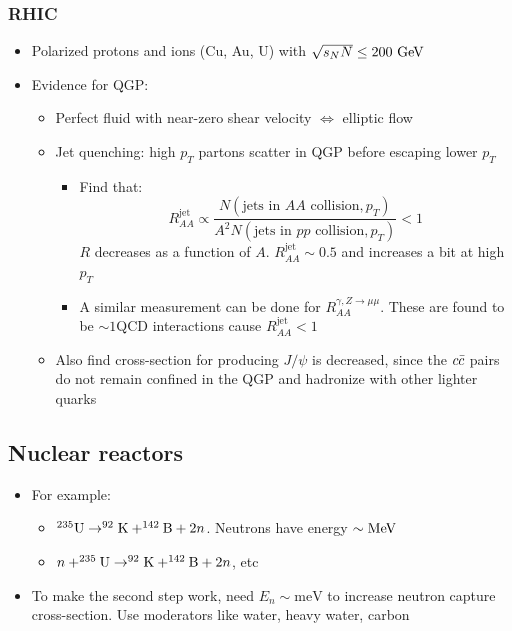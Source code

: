 \subsubsection{RHIC}
\begin{itemize}
  \item Polarized protons and ions (Cu, Au, U) with $\sqrt{s_NN} \leq 200~\text{GeV}$
  \item Evidence for QGP:
  \begin{itemize}
    \item Perfect fluid with near-zero shear velocity $\Leftrightarrow$ elliptic flow
    \item Jet quenching: high $p_T$ partons scatter in QGP before escaping \thus lower $p_T$
    \begin{itemize}
      \item Find that:
      \begin{equation}
        R^\text{jet}_{AA} \propto \dfrac{N(\text{jets in $AA$ collision},p_T)}{A^2 N(\text{jets in $pp$ collision},p_T)} < 1
      \end{equation}
      $R$ decreases as a function of $A$. $R_{AA}^\text{jet}\sim 0.5$ and increases a bit at high $p_T$
      \item A similar measurement can be done for $R_{AA}^{\gamma,Z\rightarrow\mu\mu}$. These are found to be $\sim 1$\thus QCD interactions cause $R_{AA}^\text{jet}<1$
    \end{itemize}
    \item Also find cross-section for producing $J/\psi$ is decreased, since the $c\bar{c}$ pairs do not remain confined in the QGP and hadronize with other lighter quarks
  \end{itemize}
\end{itemize}

\subsection{Nuclear reactors}
\begin{itemize}
  \item For example:
  \begin{itemize}
    \item  $^{235}\text{U}\rightarrow^{92}\text{K}+^{142}\text{B}+2n$. Neutrons have energy $\sim\text{MeV}$
    \item $n+^{235}\text{U} \rightarrow ^{92}\text{K}+^{142}\text{B} + 2n$, etc
  \end{itemize}
  \item To make the second step work, need $E_n \sim \text{meV}$ to increase neutron capture cross-section. Use moderators like water, heavy water, carbon
\end{itemize}

